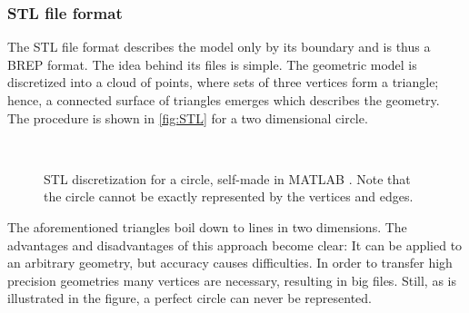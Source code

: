 \subsubsection{\acs{STL} file format} \label{subsub:STL}
The \acf{STL} file format describes the model only by its boundary and is thus a \ac{BREP} format. The idea behind its files is simple. The geometric model is discretized into a cloud of points, where sets of three vertices form a triangle; hence, a connected surface of triangles emerges which describes the geometry. The procedure is shown in \autoref{fig:STL} for a two dimensional circle.  
\begin{figure}
\centering
   \\
   \caption{\ac{STL} discretization for a circle, self-made in MATLAB \cite{MATLAB}. Note that the circle cannot be exactly represented by the vertices and edges.}
   \label{fig:STL}
\end{figure}
The aforementioned triangles boil down to lines in two dimensions. The advantages and disadvantages of this approach become clear: It can be applied to an arbitrary geometry, but accuracy causes difficulties. In order to transfer high precision geometries many vertices are necessary, resulting in big files. Still, as is illustrated in the figure, a perfect circle can never be represented. 

